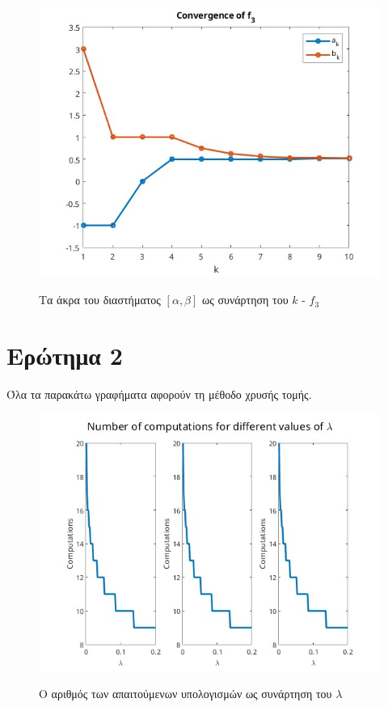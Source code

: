 \begin{figure}[H]
    \includegraphics[scale=0.7]{plots/ex1/f3.jpg}
    \label{fig:funcs}
    \caption{Τα άκρα του διαστήματος $[\alpha, \beta]$ ως συνάρτηση του $k$ - $f_3$}
    \centering
\end{figure}

\section{Ερώτημα 2}

Όλα τα παρακάτω γραφήματα αφορούν τη μέθοδο χρυσής τομής.

\begin{figure}[H]
    \includegraphics[scale=0.7]{plots/ex2/l_comps.jpg}
    \label{fig:funcs}
    \caption{Ο αριθμός των απαιτούμενων υπολογισμών ως συνάρτηση του $\lambda$}
    \centering
\end{figure}


